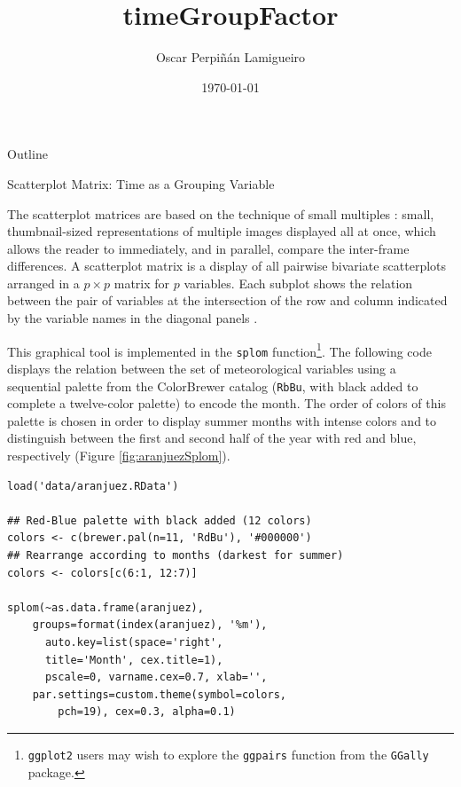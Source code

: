 \documentclass[presentation]{beamer}
\author{Oscar Perpiñán Lamigueiro}
\date{\today}
\title{timeGroupFactor}
\begin{document}
\maketitle
\begin{frame}{Outline}
\tableofcontents
\end{frame}


\begin{frame}[fragile,label=sec-1]{Scatterplot Matrix: Time as a Grouping Variable}
 \hypertarget{SEC:groupVariable}{}

The scatterplot matrices are based on the technique of small multiples
\cite{Tufte1990}: small, thumbnail-sized representations of multiple
images displayed all at once, which allows the reader to immediately,
and in parallel, compare the inter-frame differences.  A scatterplot
matrix is a display of all pairwise bivariate scatterplots arranged in
a $p \times p$ matrix for $p$ variables. Each subplot shows the
relation between the pair of variables at the intersection of the row
and column indicated by the variable names in the diagonal panels
\cite{Friendly.Denis2005}.

This graphical tool is implemented in the \texttt{splom} function\footnote{\texttt{ggplot2} users may wish to explore the \texttt{ggpairs} function
from the \texttt{GGally} package.}. The
following code displays the relation between the set of
meteorological variables using a sequential palette from the
ColorBrewer catalog (\texttt{RbBu}, with black added to complete a
twelve-color palette) to encode the month. The order of colors of
this palette is chosen in order to display summer months with
intense colors and to distinguish between the first and second
half of the year with red and blue, respectively (Figure
\ref{fig:aranjuezSplom}).


\lstset{language=R,numbers=none}
\begin{lstlisting}
load('data/aranjuez.RData')

## Red-Blue palette with black added (12 colors)
colors <- c(brewer.pal(n=11, 'RdBu'), '#000000')
## Rearrange according to months (darkest for summer)
colors <- colors[c(6:1, 12:7)]

splom(~as.data.frame(aranjuez),
	groups=format(index(aranjuez), '%m'),
      auto.key=list(space='right', 
	  title='Month', cex.title=1),
      pscale=0, varname.cex=0.7, xlab='',
	par.settings=custom.theme(symbol=colors,
	    pch=19), cex=0.3, alpha=0.1)
\end{lstlisting}


\end{frame}
\end{document}

